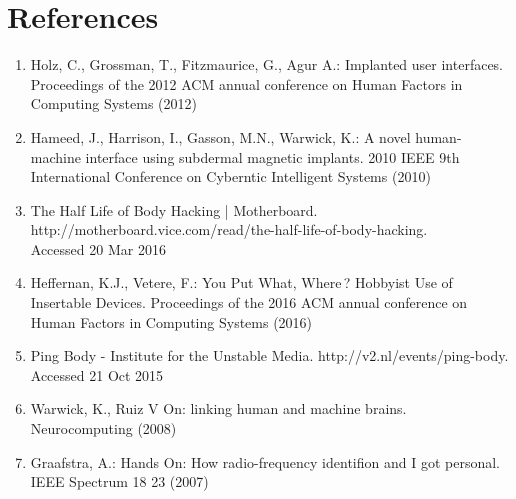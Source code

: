 \documentclass[runningheads,a4paper]{llncs}
\begin{document}
\section{References}
\begin{enumerate}
  \item Holz, C., Grossman, T.,  Fitzmaurice, G.,  Agur A.: Implanted user interfaces. Proceedings of the 2012 ACM annual conference on Human Factors in Computing Systems (2012) 
  \item Hameed, J.,  Harrison, I.,  Gasson, M.N.,  Warwick, K.:  A novel human-machine interface using subdermal magnetic implants. 2010 IEEE 9th International Conference on Cyberntic Intelligent Systems (2010) 
  \item The Half Life of Body Hacking | Motherboard.\\ http://motherboard.vice.com/read/the-half-life-of-body-hacking.\\ Accessed 20 Mar 2016
  \item Heffernan, K.J.,  Vetere, F.:  You Put What, Where ? Hobbyist Use of Insertable Devices.  Proceedings of the 2016 ACM annual conference on Human Factors in Computing Systems (2016)
  \item	Ping Body - Institute for the Unstable Media. http://v2.nl/events/ping-body. Accessed 21 Oct 2015
  \item	Warwick, K.,  Ruiz V On: linking human and machine brains. Neurocomputing  (2008) 
  \item Graafstra, A.:   Hands On: How radio-frequency identifion and I got personal. IEEE Spectrum 18 23 (2007)

\end{enumerate}
\end{document}
